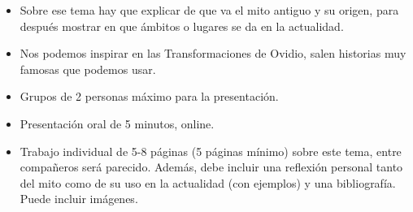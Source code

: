 \begin{enumerate}
\begin{itemize}
      \item Sobre ese tema hay que explicar de que va el mito antiguo y su origen, para después mostrar en que ámbitos o lugares se da en la actualidad.
      \item Nos podemos inspirar en las Transformaciones de Ovidio, salen historias muy famosas que podemos usar.
      \item Grupos de 2 personas máximo para la presentación.
      \item Presentación oral de 5 minutos, online.
      \item Trabajo individual de 5-8 páginas (5 páginas mínimo) sobre este tema, entre compañeros será parecido. Además, debe incluir una reflexión personal tanto del mito como de su uso en la actualidad (con ejemplos) y una bibliografía. Puede incluir imágenes.
    \end{itemize}
\end{enumerate}